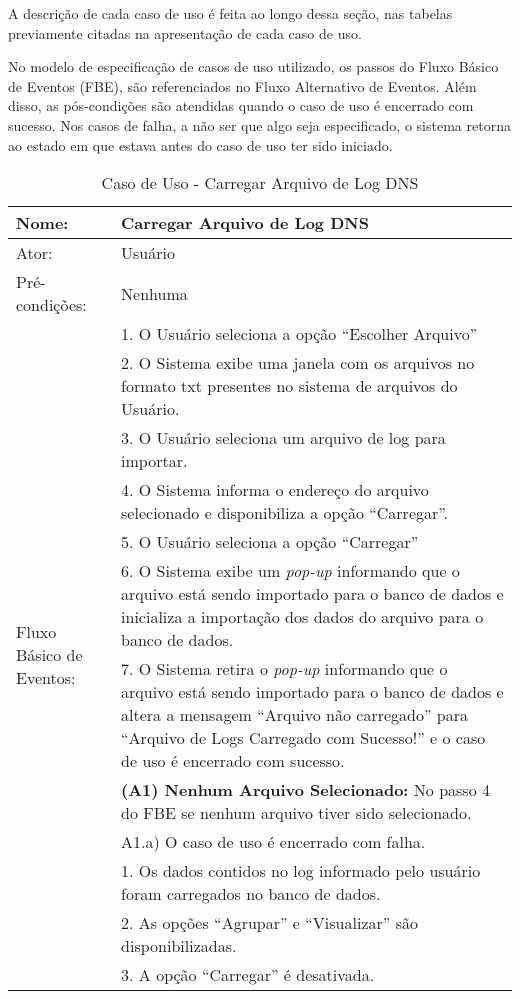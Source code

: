A descrição de cada caso de uso é feita ao longo dessa seção, nas tabelas previamente citadas na apresentação de cada caso de uso. 

No modelo de especificação de casos de uso utilizado, os passos do Fluxo Básico de Eventos (FBE), são referenciados no Fluxo Alternativo de Eventos. Além disso, as pós-condições são atendidas quando o caso de uso é encerrado com sucesso. Nos casos de falha, a não ser que algo seja especificado, o sistema retorna ao estado em que estava antes do caso de uso ter sido iniciado.

\begin{table}[]
\centering
\caption{Caso de Uso - Carregar Arquivo de Log DNS}
\label{tab:use_case_load_file}
\begin{tabular}{|lp{10cm}|}
\hline
Nome: & Carregar Arquivo de Log DNS  \\ \hline
Ator: & Usuário   \\ \hline
Pré-condições: & Nenhuma   \\ \hline
\multirow{15}{*}{Fluxo Básico de Eventos:} & 1. O Usuário seleciona a opção ``Escolher Arquivo''  \\
 & 2. O Sistema exibe uma janela com os arquivos no formato txt presentes no sistema de arquivos do Usuário.  \\
 & 3. O Usuário seleciona um arquivo de log para importar.  \\
 & 4. O Sistema informa o endereço do arquivo selecionado e disponibiliza a opção ``Carregar''. \\
 & 5. O Usuário seleciona a opção ``Carregar'' \\
 & 6. O Sistema exibe um \textit{pop-up} informando que o arquivo está sendo importado para o banco de dados e inicializa a importação dos dados do arquivo para o banco de dados. \\
 & 7. O Sistema retira o \textit{pop-up} informando que o arquivo está sendo importado para o banco de dados e altera a mensagem ``Arquivo não carregado'' para ``Arquivo de Logs Carregado com Sucesso!'' e o caso de uso é encerrado com sucesso.\\ \hline
\multirow{3}{*}{Fluxo Alternativo de Eventos:} & \textbf{(A1) Nenhum Arquivo Selecionado:} No passo 4 do FBE se nenhum arquivo tiver sido selecionado.\\
 & A1.a) O caso de uso é encerrado com falha.\\ \hline
\multirow{5}{*}{Pós-Condições:} & 1. Os dados contidos no log informado pelo usuário foram carregados no banco de dados. \\
 & 2. As opções ``Agrupar'' e ``Visualizar'' são disponibilizadas.\\
 & 3. A opção ``Carregar'' é desativada.\\
\hline 
\end{tabular}
\end{table}

